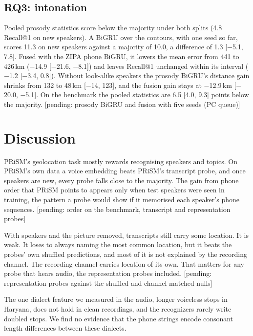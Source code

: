 \documentclass[11pt]{article}
\newcommand{\pending}[1]{{\color{red}[pending: #1]}}
\begin{document}
\begin{table}[t]
\centering\small

\caption{Haryana against New Delhi, as multiplicative effects from mixed models with 95\% confidence intervals.
The last row is the validity check on lexical geminates.}
\label{tab:gem}
\end{table}

\subsection{RQ3: intonation}
Pooled prosody statistics score below the majority under both splits (4.8 Recall@1 on new speakers). A BiGRU over
the contours, with one seed so far, scores 11.3 on new speakers against a majority of 10.0, a difference of 1.3
[$-$5.1, 7.8]. Fused with the ZIPA phone BiGRU, it lowers the mean error from 441 to 426\,km ($-$14.9 [$-$21.6,
$-$8.1]) and leaves Recall@1 unchanged within its interval ($-$1.2 [$-$3.4, 0.8]). Without look-alike speakers the
prosody BiGRU's distance gain shrinks from 132 to 48\,km [$-$14, 123], and the fusion gain stays at $-$12.9\,km
[$-$20.0, $-$5.1]. On the benchmark the pooled statistics are 6.5 [4.0, 9.3] points below the majority.
\pending{prosody BiGRU and fusion with five seeds (PC queue)}

\section{Discussion}
\label{sec:discussion}
PRiSM's geolocation task mostly rewards recognising speakers and topics. On PRiSM's own data a voice embedding beats
PRiSM's transcript probe, and once speakers are new, every probe falls close to the majority. The gain from phone
order that PRiSM points to appears only when test speakers were seen in training, the pattern a probe would show if
it memorised each speaker's phone sequences. \pending{order on the benchmark, transcript and representation probes}

With speakers and the picture removed, transcripts still carry some location. It is weak. It loses to always naming
the most common location, but it beats the probes' own shuffled predictions, and most of it is not explained by the
recording channel. The recording channel carries location of its own. That matters for any probe that hears audio,
the representation probes included. \pending{representation probes against the shuffled and channel-matched nulls}

The one dialect feature we measured in the audio, longer voiceless stops in Haryana, does not hold in clean
recordings, and the recognizers rarely write doubled stops. We find no evidence that the phone strings encode
consonant length differences between these dialects.
\end{document}
